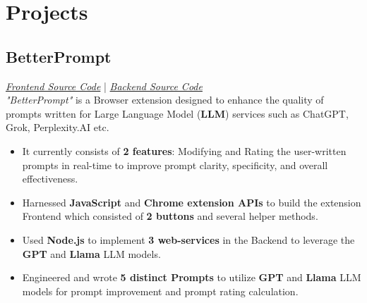 \documentclass[a4paper,12pt]{article}
\begin{document}
\section*{Projects}
\subsection*{BetterPrompt} \textit{\href{https://github.com/BtrPrmt/BetterPrompt-extension}{Frontend Source Code}} | \textit{\href{https://github.com/BtrPrmt/BetterPrompt-WS}{Backend Source Code}} \\
\textit{"BetterPrompt"} is a Browser extension designed to enhance the quality of prompts written for Large Language Model (\textbf{LLM}) services such as ChatGPT, Grok, Perplexity.AI etc.
\begin{itemize}[leftmargin=1.5em]
    \item It currently consists of \textbf{2 features}: Modifying and Rating the user-written prompts in real-time to improve prompt clarity, specificity, and overall effectiveness.
    \item Harnessed \textbf{JavaScript} and \textbf{Chrome extension APIs} to build the extension Frontend which consisted of \textbf{2 buttons} and several helper methods. 
    \item Used \textbf{Node.js} to implement \textbf{3 web-services} in the Backend to leverage the \textbf{GPT} and \textbf{Llama} LLM models.  
    \item Engineered and wrote \textbf{5 distinct Prompts} to utilize \textbf{GPT} and \textbf{Llama} LLM models for prompt improvement and prompt rating calculation.
\end{itemize}
\end{document}
